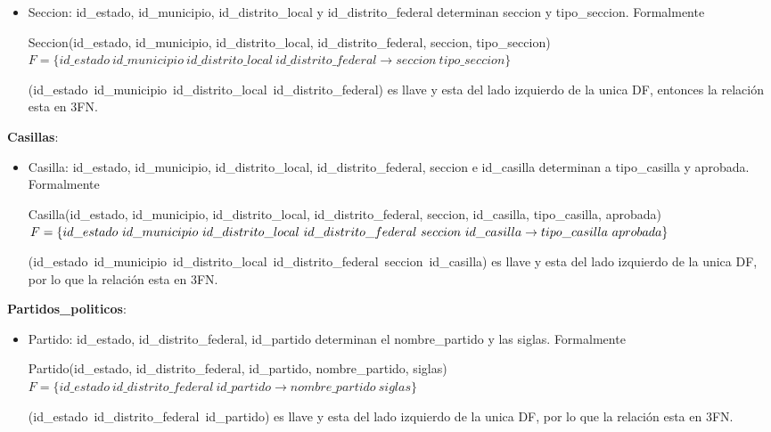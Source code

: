 \documentclass[a4paper,twoside,11pt]{article}
\begin{document}
\begin{itemize}
  \item Seccion: id\_estado, id\_municipio, id\_distrito\_local y id\_distrito\_federal
        determinan seccion y tipo\_seccion. Formalmente

        Seccion(id\_estado, id\_municipio, id\_distrito\_local, id\_distrito\_federal, seccion,
        tipo\_seccion)\\
        $F=\{id\_estado~id\_municipio~id\_distrito\_local~id\_distrito\_federal\rightarrow
             seccion~tipo\_seccion\}$

        (id\_estado~id\_municipio~id\_distrito\_local~id\_distrito\_federal) es llave y esta del lado
        izquierdo de la unica DF, entonces la relación esta en 3FN.
\end{itemize}

\textbf{Casillas}:
\begin{itemize}
  \item Casilla: id\_estado, id\_municipio, id\_distrito\_local, id\_distrito\_federal, seccion
        e id\_casilla determinan a tipo\_casilla y aprobada. Formalmente

        Casilla(id\_estado, id\_municipio, id\_distrito\_local, id\_distrito\_federal,
         seccion, id\_casilla, tipo\_casilla, aprobada)\\
        $F=\{id\_estado~id\_municipio~id\_distrito\_local~id\_distrito\_federal~seccion~id\_casilla\rightarrow\\
        tipo\_casilla~aprobada\}$

        (id\_estado~id\_municipio~id\_distrito\_local~id\_distrito\_federal~seccion~id\_casilla) es
        llave y esta del lado izquierdo de la unica DF, por lo que la relación esta en 3FN.
\end{itemize}

\textbf{Partidos\_politicos}:
\begin{itemize}
  \item Partido: id\_estado, id\_distrito\_federal, id\_partido determinan el nombre\_partido y las siglas.
        Formalmente

        Partido(id\_estado, id\_distrito\_federal, id\_partido, nombre\_partido, siglas)\\
        $F=\{id\_estado~id\_distrito\_federal~id\_partido\rightarrow nombre\_partido~siglas\}$

        (id\_estado~id\_distrito\_federal~id\_partido) es llave y esta del lado izquierdo de la unica DF,
        por lo que la relación esta en 3FN.
\end{itemize}
\end{document}
